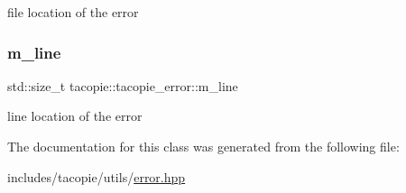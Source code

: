 file location of the error \mbox{\label{classtacopie_1_1tacopie__error_a1631d3a1ba6d610e6c6ab0ddaf70b354}} 
\subsubsection{\texorpdfstring{m\+\_\+line}{m\_line}}
{\footnotesize\ttfamily std\+::size\+\_\+t tacopie\+::tacopie\+\_\+error\+::m\+\_\+line\hspace{0.3cm}{\ttfamily [private]}}

line location of the error 

The documentation for this class was generated from the following file\+:\begin{DoxyCompactItemize}
\item 
includes/tacopie/utils/\hyperlink{error_8hpp}{error.\+hpp}\end{DoxyCompactItemize}

